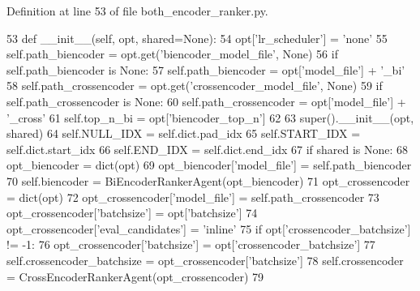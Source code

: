 Definition at line 53 of file both\+\_\+encoder\+\_\+ranker.\+py.


\begin{DoxyCode}
53     \textcolor{keyword}{def }\_\_init\_\_(self, opt, shared=None):
54         opt[\textcolor{stringliteral}{'lr\_scheduler'}] = \textcolor{stringliteral}{'none'}
55         self.path\_biencoder = opt.get(\textcolor{stringliteral}{'biencoder\_model\_file'}, \textcolor{keywordtype}{None})
56         \textcolor{keywordflow}{if} self.path\_biencoder \textcolor{keywordflow}{is} \textcolor{keywordtype}{None}:
57             self.path\_biencoder = opt[\textcolor{stringliteral}{'model\_file'}] + \textcolor{stringliteral}{'\_bi'}
58         self.path\_crossencoder = opt.get(\textcolor{stringliteral}{'crossencoder\_model\_file'}, \textcolor{keywordtype}{None})
59         \textcolor{keywordflow}{if} self.path\_crossencoder \textcolor{keywordflow}{is} \textcolor{keywordtype}{None}:
60             self.path\_crossencoder = opt[\textcolor{stringliteral}{'model\_file'}] + \textcolor{stringliteral}{'\_cross'}
61         self.top\_n\_bi = opt[\textcolor{stringliteral}{'biencoder\_top\_n'}]
62 
63         super().\_\_init\_\_(opt, shared)
64         self.NULL\_IDX = self.dict.pad\_idx
65         self.START\_IDX = self.dict.start\_idx
66         self.END\_IDX = self.dict.end\_idx
67         \textcolor{keywordflow}{if} shared \textcolor{keywordflow}{is} \textcolor{keywordtype}{None}:
68             opt\_biencoder = dict(opt)
69             opt\_biencoder[\textcolor{stringliteral}{'model\_file'}] = self.path\_biencoder
70             self.biencoder = BiEncoderRankerAgent(opt\_biencoder)
71             opt\_crossencoder = dict(opt)
72             opt\_crossencoder[\textcolor{stringliteral}{'model\_file'}] = self.path\_crossencoder
73             opt\_crossencoder[\textcolor{stringliteral}{'batchsize'}] = opt[\textcolor{stringliteral}{'batchsize'}]
74             opt\_crossencoder[\textcolor{stringliteral}{'eval\_candidates'}] = \textcolor{stringliteral}{'inline'}
75             \textcolor{keywordflow}{if} opt[\textcolor{stringliteral}{'crossencoder\_batchsize'}] != -1:
76                 opt\_crossencoder[\textcolor{stringliteral}{'batchsize'}] = opt[\textcolor{stringliteral}{'crossencoder\_batchsize'}]
77             self.crossencoder\_batchsize = opt\_crossencoder[\textcolor{stringliteral}{'batchsize'}]
78             self.crossencoder = CrossEncoderRankerAgent(opt\_crossencoder)
79 
\end{DoxyCode}


